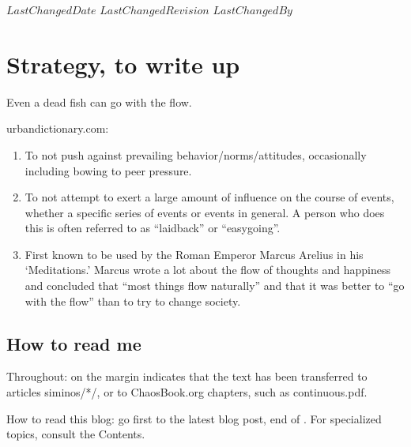 {$LastChangedDate$}
{$LastChangedRevision$} {$LastChangedBy$}


\chapter{Strategy, to write up}

\begin{bartlett}{
Even a dead fish can go with the flow.}
\end{bartlett}


{urbandictionary.com}:

\begin{enumerate}
   \item To not push against prevailing behavior/norms/attitudes,
   occasionally including bowing to peer pressure.

   \item To not attempt to exert a large amount of influence on the
   course of events, whether a specific series of events or events in
   general. A person who does this is often referred to as ``laidback''
   or ``easygoing''.

   \item First known to be used by the Roman Emperor Marcus Arelius in
   his `Meditations.' Marcus wrote a lot about the flow of
   thoughts and happiness and concluded that ``most things flow
   naturally'' and that it was better to ``go with the flow''
   than to try to change society.
 \end{enumerate}

\section{How to read me}

Throughout:  {\textdollar} on the margin
{\steady}
indicates that the text has been transferred to
articles siminos/*/,  or to ChaosBook.org
chapters, such as
{continuous.pdf}.

How to read this blog: go first to the latest blog post, end
of . For specialized topics, consult the
Contents.


